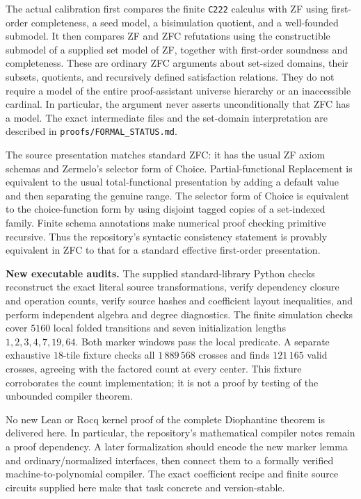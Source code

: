 \documentclass[11pt,a4paper]{article}
\theoremstyle{remark}
\newcommand{\code}[1]{\nolinkurl{#1}}
\begin{document}
The actual calibration first compares the finite \code{C222} calculus
with ZF using first-order completeness, a seed model, a bisimulation
quotient, and a well-founded submodel. It then compares ZF and ZFC
refutations using the constructible submodel of a supplied set model
of ZF, together with first-order soundness and completeness. These are
ordinary ZFC arguments about set-sized domains, their subsets, quotients,
and recursively defined satisfaction relations. They do not require a
model of the entire proof-assistant universe hierarchy or an inaccessible
cardinal. In particular, the argument never asserts unconditionally that
ZFC has a model. The exact intermediate files and the set-domain
interpretation are described in \code{proofs/FORMAL_STATUS.md}.

The source presentation matches standard ZFC: it has the usual ZF axiom
schemas and Zermelo's selector form of Choice. Partial-functional
Replacement is equivalent to the usual total-functional presentation
by adding a default value and then separating the genuine range.
The selector form of Choice is equivalent to the choice-function form
by using disjoint tagged copies of a set-indexed family. Finite schema
annotations make numerical proof checking primitive recursive. Thus the
repository's syntactic consistency statement is provably equivalent in
ZFC to that for a standard effective first-order presentation.

\textbf{New executable audits.} The supplied standard-library Python
checks reconstruct the exact literal source transformations, verify
dependency closure and operation counts, verify source hashes and
coefficient layout inequalities, and perform independent algebra and
degree diagnostics. The finite simulation checks cover $5160$ local
folded transitions and seven initialization lengths
$1,2,3,4,7,19,64$. Both marker windows pass the local predicate. A
separate exhaustive $18$-tile fixture checks all $1\,889\,568$ crosses
and finds $121\,165$ valid crosses, agreeing with the factored count
at every center. This fixture corroborates the count implementation;
it is not a proof by testing of the unbounded compiler theorem.

No new Lean or Rocq kernel proof of the complete Diophantine theorem
is delivered here. In particular, the repository's mathematical
compiler notes remain a proof dependency. A later formalization should
encode the new marker lemma and ordinary/normalized interfaces, then
connect them to a formally verified machine-to-polynomial compiler.
The exact coefficient recipe and finite source circuits supplied here
make that task concrete and version-stable.
\end{document}
